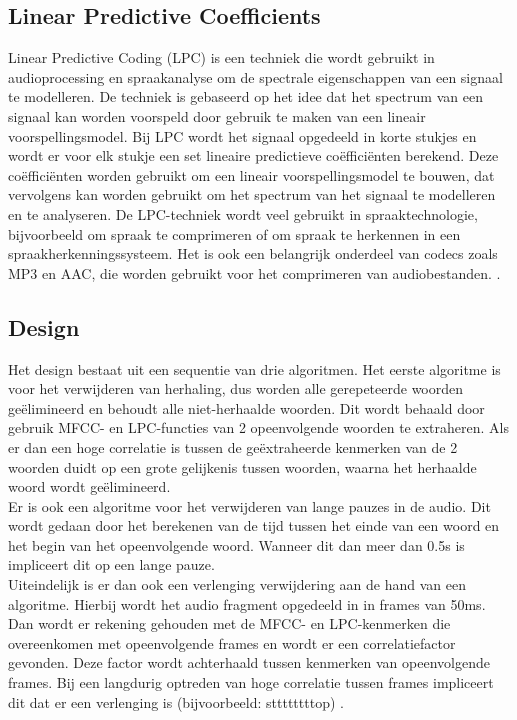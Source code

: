 \subsection{Linear Predictive Coefficients}
Linear Predictive Coding (LPC) is een techniek die wordt gebruikt in audioprocessing en spraakanalyse om de spectrale eigenschappen van een signaal te modelleren. De techniek is gebaseerd op het idee dat het spectrum van een signaal kan worden voorspeld door gebruik te maken van een lineair voorspellingsmodel. Bij LPC wordt het signaal opgedeeld in korte stukjes en wordt er voor elk stukje een set lineaire predictieve coëfficiënten berekend. Deze coëfficiënten worden gebruikt om een lineair voorspellingsmodel te bouwen, dat vervolgens kan worden gebruikt om het spectrum van het signaal te modelleren en te analyseren. De LPC-techniek wordt veel gebruikt in spraaktechnologie, bijvoorbeeld om spraak te comprimeren of om spraak te herkennen in een spraakherkenningssysteem. Het is ook een belangrijk onderdeel van codecs zoals MP3 en AAC, die worden gebruikt voor het comprimeren van audiobestanden. \autocite{bradbury2000linear}. 
 
\subsection{Design}
Het design bestaat uit een sequentie van drie algoritmen. Het eerste algoritme is voor het verwijderen van herhaling, dus worden alle gerepeteerde woorden geëlimineerd en behoudt alle niet-herhaalde woorden. Dit wordt behaald door gebruik MFCC- en LPC-functies van 2 opeenvolgende woorden te extraheren. Als er dan een hoge correlatie is tussen de geëxtraheerde kenmerken van de 2 woorden duidt op een grote gelijkenis tussen woorden, waarna het herhaalde woord wordt geëlimineerd.\\

Er is ook een algoritme voor het verwijderen van lange pauzes in de audio. Dit wordt gedaan door het berekenen van de tijd tussen het einde van een woord en het begin van het opeenvolgende woord. Wanneer dit dan meer dan 0.5s is impliceert dit op een lange pauze.\\

Uiteindelijk is er dan ook een verlenging verwijdering aan de hand van een algoritme. Hierbij wordt het audio fragment opgedeeld in in frames van 50ms. Dan wordt er rekening gehouden met de MFCC- en LPC-kenmerken die overeenkomen met opeenvolgende frames en wordt er een correlatiefactor gevonden. Deze factor wordt achterhaald tussen kenmerken van opeenvolgende frames. Bij een langdurig optreden van hoge correlatie tussen frames impliceert dit dat er een verlenging is (bijvoorbeeld: sttttttttop) \autocite{KN2020}.

